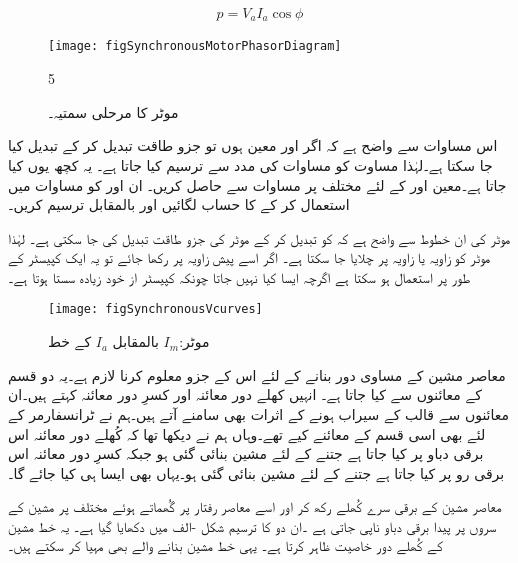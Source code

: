 \begin{align}\label{مساوات_معاصر_طاقت_برابر_دباو_رو_جزو_طاقت}
p=V_a I_a \cos \phi
\end{align}
%
\begin{figure}
\centering
\texttt{[image: figSynchronousMotorPhasorDiagram]}
\caption{موٹر کا مرحلی سمتیہ۔}
\label{شکل_معاصر_موٹر_کی_دوری_سمتیہ}
5\end{figure}
%
اس مساوات سے واضح ہے کہ اگر  اور  معین ہوں تو جزو طاقت تبدیل کر کے  تبدیل کیا جا سکتا ہے۔لہٰذا مساوت   کو مساوات   کی مدد سے ترسیم کیا جاتا ہے۔ یہ کچھ یوں کیا جاتا ہے۔معین  اور  کے لئے مختلف  پر مساوات    سے  حاصل کریں۔ ان  اور  کو مساوات   میں استعمال کر کے  کا حساب لگائیں اور  بالمقابل  ترسیم کریں۔

موٹر کی ان خطوط سے واضح ہے کہ  کو تبدیل کر کے موٹر کی جزو طاقت تبدیل کی جا سکتی ہے۔ لہٰذا موٹر کو  زاویہ یا  زاویہ  پر چلایا جا سکتا ہے۔ اگر اسے پیش زاویہ پر رکھا جائے تو یہ ایک کپیسٹر  کے طور پر استعمال ہو سکتا ہے اگرچہ ایسا کیا نہیں جاتا چونکہ کپیسٹر از خود  زیادہ سستا ہوتا ہے۔ 
\begin{figure}
\centering
\texttt{[image: figSynchronousVcurves]}
\caption{موٹر:$I_{m}$ بالمقابل $I_a$ کے خط}
\label{شکل_معاصر_برقی_رو_بالمقابل_برقی_دباو}
\end{figure}
معاصر مشین کے مساوی دور بنانے کے لئے اس کے جزو معلوم کرنا لازم ہے۔یہ دو قسم کے معائنوں سے کیا جاتا ہے۔ انہیں کھلے دور معائنہ اور کسرِ دور معائنہ کہتے ہیں۔ان معائنوں سے قالب کے سیراب ہونے کے اثرات بھی سامنے آتے ہیں۔ہم نے ٹرانسفارمر کے لئے بھی اسی قسم کے معائنے کیے تھے۔وہاں ہم نے دیکھا تھا کہ کُھلے دور معائنہ اس برقی دباو پر کیا جاتا ہے جتنے کے لئے مشین بنائی گئی ہو جبکہ کسرِ دور معائنہ اس برقی رو پر کیا جاتا ہے جتنے کے لئے مشین بنائی گئی ہو۔یہاں بھی ایسا ہی کیا جائے گا۔ 

معاصر مشین کے برقی سرے کُھلے رکھ کر اور اسے معاصر رفتار پر گُھماتے ہوئے مختلف  پر  مشین کے سروں پر پیدا برقی دباو  ناپی جاتی ہے ۔ان دو کا ترسیم شکل -الف میں دکھایا گیا ہے۔ یہ خط مشین کے کُھلے دور خاصیت ظاہر کرتا ہے۔ یہی خط مشین بنانے والے بھی مہیا کر سکتے ہیں۔

